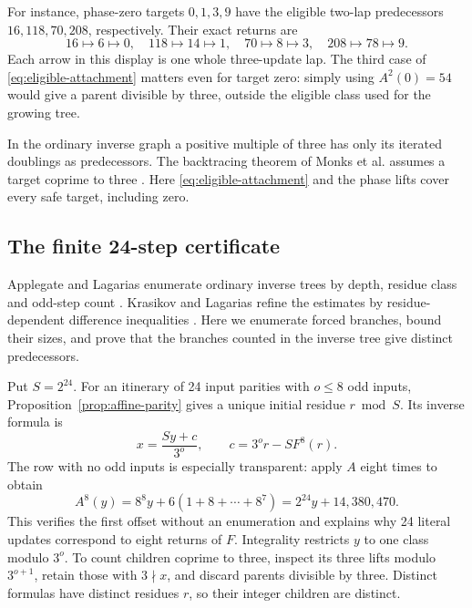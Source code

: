 For instance, phase-zero targets $0,1,3,9$ have the eligible two-lap
predecessors $16,118,70,208$, respectively. Their exact returns are
\[
 16\mapsto6\mapsto0,\quad118\mapsto14\mapsto1,\quad
 70\mapsto8\mapsto3,\quad208\mapsto78\mapsto9.
\]
Each arrow in this display is one whole three-update lap. The third
case of \eqref{eq:eligible-attachment} matters even for target zero:
simply using $A^2(0)=54$ would give a parent divisible by three,
outside the eligible class used for the growing tree.

In the ordinary inverse graph a positive multiple of three has only
its iterated doublings as predecessors. The backtracing theorem of
Monks et al. assumes a target coprime to three
\cite[Theorem~4.1]{monks-et-al-2013}. Here
\eqref{eq:eligible-attachment} and the phase lifts cover every safe
target, including zero.

\subsection{The finite 24-step certificate}

Applegate and Lagarias enumerate ordinary inverse trees by depth,
residue class and odd-step count \cite[Sections~2--3]{applegate-lagarias-1995-i}.
Krasikov and Lagarias refine the estimates by residue-dependent
difference inequalities \cite[Theorems~2.2 and~6.1]{krasikov-lagarias}.
Here we enumerate forced branches, bound their sizes, and prove that
the branches counted in the inverse tree give distinct predecessors.

Put $S=2^{24}$. For an itinerary of 24 input parities with $o\le8$ odd
inputs, Proposition~\ref{prop:affine-parity} gives a unique initial residue
$r\bmod S$. Its inverse formula is
\begin{equation}\label{eq:inverse-offset}
 x=\frac{Sy+c}{3^o},\qquad c=3^or-SF^8(r).
\end{equation}
The row with no odd inputs is especially transparent: apply $A$ eight
times to obtain
\[
 A^8(y)=8^8y+6(1+8+\cdots+8^7)
       =2^{24}y+14{,}380{,}470.
\]
This verifies the first offset without an enumeration and explains why
24 literal updates correspond to eight returns of $F$.
Integrality restricts $y$ to one class modulo $3^o$. To count children
coprime to three, inspect its three lifts modulo $3^{o+1}$, retain those
with $3\nmid x$, and discard parents divisible by three. Distinct formulas
have distinct residues $r$, so their integer children are distinct.

